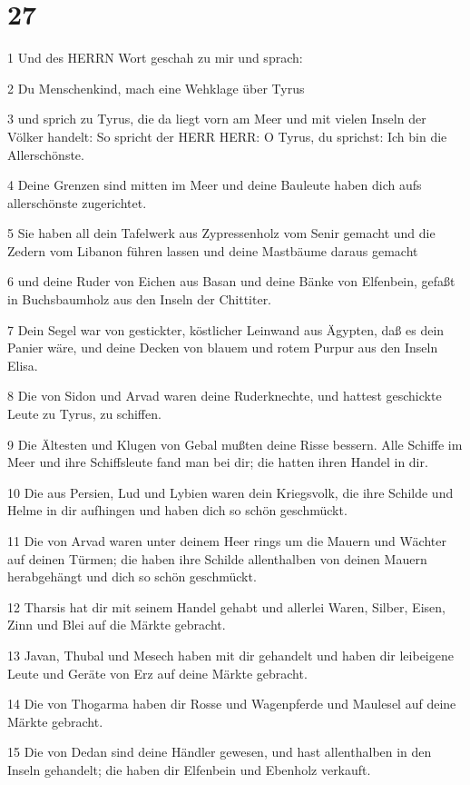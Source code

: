 \chapter{27}

\par 1 Und des HERRN Wort geschah zu mir und sprach:
\par 2 Du Menschenkind, mach eine Wehklage über Tyrus
\par 3 und sprich zu Tyrus, die da liegt vorn am Meer und mit vielen Inseln der Völker handelt: So spricht der HERR HERR: O Tyrus, du sprichst: Ich bin die Allerschönste.
\par 4 Deine Grenzen sind mitten im Meer und deine Bauleute haben dich aufs allerschönste zugerichtet.
\par 5 Sie haben all dein Tafelwerk aus Zypressenholz vom Senir gemacht und die Zedern vom Libanon führen lassen und deine Mastbäume daraus gemacht
\par 6 und deine Ruder von Eichen aus Basan und deine Bänke von Elfenbein, gefaßt in Buchsbaumholz aus den Inseln der Chittiter.
\par 7 Dein Segel war von gestickter, köstlicher Leinwand aus Ägypten, daß es dein Panier wäre, und deine Decken von blauem und rotem Purpur aus den Inseln Elisa.
\par 8 Die von Sidon und Arvad waren deine Ruderknechte, und hattest geschickte Leute zu Tyrus, zu schiffen.
\par 9 Die Ältesten und Klugen von Gebal mußten deine Risse bessern. Alle Schiffe im Meer und ihre Schiffsleute fand man bei dir; die hatten ihren Handel in dir.
\par 10 Die aus Persien, Lud und Lybien waren dein Kriegsvolk, die ihre Schilde und Helme in dir aufhingen und haben dich so schön geschmückt.
\par 11 Die von Arvad waren unter deinem Heer rings um die Mauern und Wächter auf deinen Türmen; die haben ihre Schilde allenthalben von deinen Mauern herabgehängt und dich so schön geschmückt.
\par 12 Tharsis hat dir mit seinem Handel gehabt und allerlei Waren, Silber, Eisen, Zinn und Blei auf die Märkte gebracht.
\par 13 Javan, Thubal und Mesech haben mit dir gehandelt und haben dir leibeigene Leute und Geräte von Erz auf deine Märkte gebracht.
\par 14 Die von Thogarma haben dir Rosse und Wagenpferde und Maulesel auf deine Märkte gebracht.
\par 15 Die von Dedan sind deine Händler gewesen, und hast allenthalben in den Inseln gehandelt; die haben dir Elfenbein und Ebenholz verkauft.
